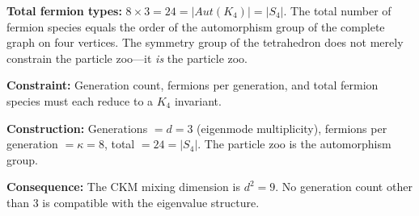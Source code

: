 \documentclass[11pt,a4paper]{book}
\def\mathrm#1{#1}%
\begin{document}
\textbf{Total fermion types:} $8 \times 3 = 24 = |\mathrm{Aut}(K_4)| = |S_4|$. The total number of fermion species equals the order of the automorphism group of the complete graph on four vertices. The symmetry group of the tetrahedron does not merely constrain the particle zoo---it \emph{is} the particle zoo.

\textbf{Constraint:} Generation count, fermions per generation, and total fermion species must each reduce to a $K_4$ invariant.

\textbf{Construction:} Generations $= d = 3$ (eigenmode multiplicity), fermions per generation $= \kappa = 8$, total $= 24 = |S_4|$. The particle zoo is the automorphism group.

\textbf{Consequence:} The CKM mixing dimension is $d^2 = 9$. No generation count other than $3$ is compatible with the eigenvalue structure.
\end{document}
